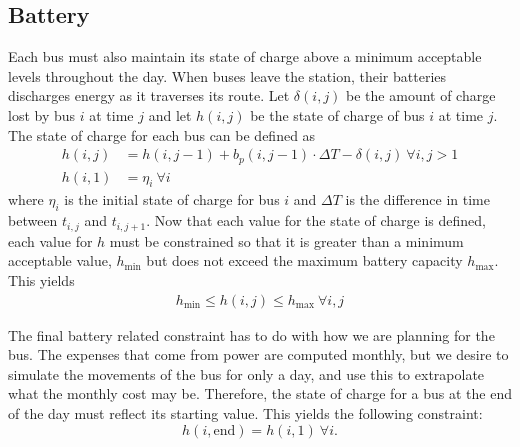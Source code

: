 \subsection{Battery}

\par Each bus must also maintain its state of charge above a minimum acceptable levels throughout the day.  When buses leave the station, their batteries discharges energy as it traverses its route. Let $\delta(i,j)$ be the amount of charge lost by bus $i$ at time $j$ and let $h(i,j)$ be the state of charge of bus $i$ at time $j$. The state of charge for each bus can be defined as
\begin{equation}\label{eqn:battery:socPropagation}\begin{aligned}
	h(i,j) &= h(i,j-1) + b_p(i,j - 1)\cdot \Delta T - \delta(i,j) \ \forall i,j>1 \\
	h(i,1) &= \eta_i \ \forall i
\end{aligned}\end{equation}
where $\eta_i$ is the initial state of charge for bus $i$ and $\Delta T$ is the difference in time between $t_{i,j}$ and $t_{i,j+1}$.
Now that each value for the state of charge is defined, each value for $h$ must be constrained so that it is greater than a minimum acceptable value, $h_{\text{min}}$ but does not exceed the maximum battery capacity $h_{\text{max}}$. This yields
\begin{equation} \label{eqn:battery:soc}\begin{aligned}
	h_{\text{min}} \leq h(i,j) \leq h_{\text{max}} \ \forall i,j
      \end{aligned}\end{equation}

\par The final battery related constraint has to do with how we are planning for the bus.  The expenses that come from power are computed monthly, but we desire to simulate the movements of the bus for only a day, and use this to extrapolate what the monthly cost may be.  Therefore, the state of charge for a bus at the end of the day must reflect its starting value.  This yields the following constraint:
\begin{equation}\label{eqn:battery:busPower}
	h(i,\text{end}) = h(i,1) \ \forall i.
\end{equation}

